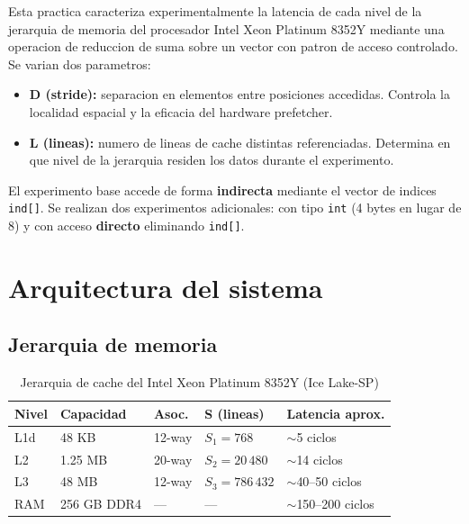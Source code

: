 \documentclass[12pt,a4paper]{article}
\begin{document}
Esta practica caracteriza experimentalmente la latencia de cada nivel de la jerarquia de memoria del procesador Intel Xeon Platinum 8352Y mediante una operacion de reduccion de suma sobre un vector con patron de acceso controlado. Se varian dos parametros:

\begin{itemize}[leftmargin=1.5em]
  \item \textbf{D (stride):} separacion en elementos entre posiciones accedidas. Controla la localidad espacial y la eficacia del hardware prefetcher.
  \item \textbf{L (lineas):} numero de lineas de cache distintas referenciadas. Determina en que nivel de la jerarquia residen los datos durante el experimento.
\end{itemize}

El experimento base accede de forma \textbf{indirecta} mediante el vector de indices \texttt{ind[]}. Se realizan dos experimentos adicionales: con tipo \texttt{int} (4 bytes en lugar de 8) y con acceso \textbf{directo} eliminando \texttt{ind[]}.

\section{Arquitectura del sistema}

\subsection{Jerarquia de memoria}

\begin{table}[H]
\centering
\caption{Jerarquia de cache del Intel Xeon Platinum 8352Y (Ice Lake-SP)}
\label{tab:jerarquia}
\begin{tabular}{lllll}
\toprule
\textbf{Nivel} & \textbf{Capacidad} & \textbf{Asoc.} & \textbf{S (lineas)} & \textbf{Latencia aprox.} \\
\midrule
L1d & 48 KB   & 12-way & $S_1 = 768$       & $\sim$5 ciclos \\
L2  & 1.25 MB & 20-way & $S_2 = 20\,480$   & $\sim$14 ciclos \\
L3  & 48 MB   & 12-way & $S_3 = 786\,432$  & $\sim$40--50 ciclos \\
RAM & 256 GB DDR4 & ---  & ---              & $\sim$150--200 ciclos \\
\bottomrule
\end{tabular}
\end{table}
\end{document}
